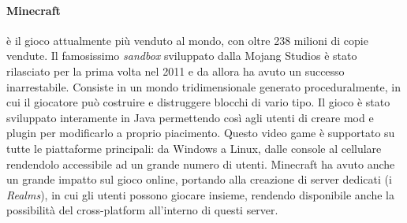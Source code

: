         \paragraph{Minecraft} è il gioco attualmente più venduto al mondo, con oltre 238 milioni di copie vendute. Il famosissimo \textit{sandbox} sviluppato dalla Mojang Studios è stato
            rilasciato per la prima volta nel 2011 e da allora ha avuto un successo inarrestabile. Consiste in un mondo tridimensionale generato proceduralmente, in cui il giocatore
            può costruire e distruggere blocchi di vario tipo. Il gioco è stato sviluppato interamente in Java permettendo così agli utenti di creare mod e plugin per modificarlo
            a proprio piacimento. Questo video game è supportato su tutte le piattaforme principali: da Windows a Linux, dalle console al cellulare rendendolo accessibile ad un grande
            numero di utenti. Minecraft ha avuto anche un grande impatto sul gioco online, portando alla creazione di server dedicati (i \textit{Realms}), in cui gli utenti possono 
            giocare insieme, rendendo disponibile anche la possibilità del cross-platform all'interno di questi server.

